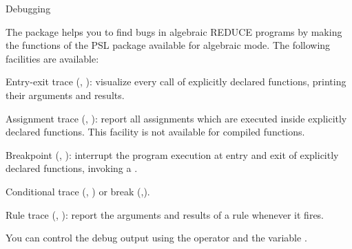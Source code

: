 

\begin{Introduction}{Debugging}

The package  helps you to find bugs in algebraic
REDUCE programs by making the functions of the PSL package 
 available for algebraic mode.
The following facilities are available:

Entry-exit trace (, ): 
visualize every call of 
explicitly declared functions, printing their arguments and
results.

Assignment trace (, ): 
report all assignments which
are executed inside explicitly declared functions. This facility
is not available for compiled functions.

Breakpoint (, ): 
interrupt the program execution at
entry and exit of explicitly declared functions, invoking
a .

Conditional trace (, ) 
or break (,).

Rule trace (, ): 
report the arguments and results of a rule whenever it fires.

You can control the debug output using the operator 
and the variable .

\end{Introduction}


